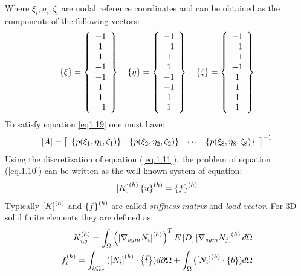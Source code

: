 Where $\xi_i,\eta_i,\zeta_i$ are nodal reference coordinates and can be obtained as the components of the following vectors:
\begin{eqnarray}
	\left\lbrace{\xi}\right \rbrace=\left\lbrace{\begin{array}{c}
		-1\\1\\1\\-1\\-1\\1\\1\\-1
		\end{array}}\right \rbrace \quad \left\lbrace{\eta}\right \rbrace=\left\lbrace{\begin{array}{c}
		-1\\-1\\1\\1\\-1\\-1\\1\\1
		\end{array}}\right \rbrace \quad\left\lbrace{\zeta}\right \rbrace=\left\lbrace{\begin{array}{c}
		-1\\-1\\-1\\-1\\1\\1\\1\\1
		\end{array}}\right \rbrace
\end{eqnarray}
To satisfy equation \ref{eq1.19} one must have:
\begin{equation}
\left[{A}\right]=\left[{\begin{array}{cccc}
\left\lbrace{p(\xi_1,\eta_1,\zeta_1)}\right \rbrace&\left\lbrace{p(\xi_2,\eta_2,\zeta_2)}\right \rbrace&\cdots&\left\lbrace{p(\xi_8,\eta_8,\zeta_8)}\right \rbrace
\end{array}}\right]^{-1}
\end{equation}
Using the discretization of equation (\ref{eq.1.11}), the problem of equation (\ref{eq.1.10}) can be written as the well-known system of equation:
\begin{equation}
\label{eq.1.13}
\left[{K}\right]^{(h)}\left\lbrace{u}\right \rbrace^{(h)}=\left\lbrace{f}\right \rbrace^{(h)}
\end{equation}
Typically $\left[{K}\right]^{(h)}$ and $\left\lbrace{f}\right \rbrace^{(h)}$ are called \textit{stiffness matrix} and \textit{load vector}.
For 3D solid finite elements they are defined as:
\begin{eqnarray}
\label{eq.1.14}
{K}_{i,j}^{(h)}=\int_{\Omega}{\left(\left[{\nabla_{sym}N_i}\right]^{(h)}\right)^T E\left[{D}\right]\left[{\nabla_{sym}N_j}\right]^{(h)}   d\Omega}\\
\label{eq.1.15}
{f}_{i}^{(h)}=\int_{\partial \Omega_{\sigma}}{(\left[{N_i}\right]^{(h)} \cdot \left\lbrace{\bar{t}}\right \rbrace )d\partial \Omega}+\int_{\Omega}{(\left[{N_i}\right]^{(h)}\cdot \left\lbrace{b}\right \rbrace) d\Omega}
\end{eqnarray}
